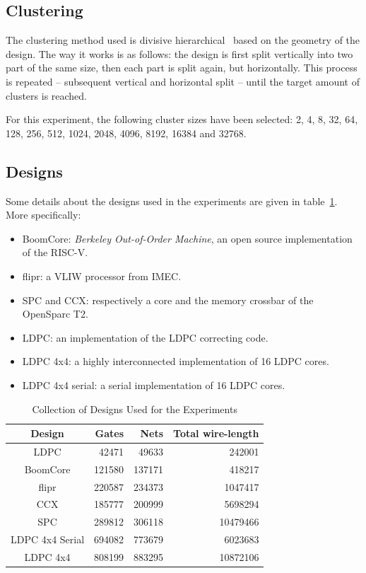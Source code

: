 \documentclass[conference]{IEEEtran}
\begin{document}
\subsection{Clustering}
The clustering method used is divisive hierarchical~\cite{Rokach2005} based on the geometry of the design.
The way it works is as follows: the design is first split vertically into two part of the same size, then each part is split again, but horizontally.
This process is repeated -- subsequent vertical and horizontal split -- until the target amount of clusters is reached.

For this experiment, the following cluster sizes have been selected: 2, 4, 8, 32, 64, 128, 256, 512, 1024, 2048, 4096, 8192, 16384 and 32768.

\subsection{Designs}
Some details about the designs used in the experiments are given in table~\ref{tab:designs}.
More specifically:
\begin{itemize}
    \item BoomCore: \textit{Berkeley Out-of-Order Machine}, an open source implementation of the RISC-V.
    \item flipr: a VLIW processor from IMEC.
    \item SPC and CCX: respectively a core and the memory crossbar of the OpenSparc T2.
    \item LDPC: an implementation of the LDPC correcting code.
    \item LDPC 4x4: a highly interconnected implementation of 16 LDPC cores.
    \item LDPC 4x4 serial: a serial implementation of 16 LDPC cores.
\end{itemize}


\begin{table}[!t]
\renewcommand{\arraystretch}{1.3}
\caption{Collection of Designs Used for the Experiments}
\label{tab:designs}
\centering
\begin{tabular}{||c|r|r|r||}
\hline
Design & Gates & Nets & Total wire-length\\
\hline
\hline
LDPC & 42471 & 49633 & 242001\\
\hline
BoomCore & 121580 & 137171 & 418217\\
\hline
flipr & 220587 & 234373 & 1047417 \\
\hline
CCX & 185777 & 200999 & 5698294\\
\hline
SPC & 289812 & 306118 & 10479466\\
\hline
LDPC 4x4 Serial & 694082 & 773679 & 6023683\\
\hline
LDPC 4x4 & 808199 & 883295 & 10872106\\
\hline
\end{tabular}
\end{table}
\end{document}
